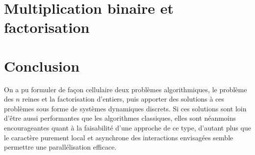 \documentclass[11pt, openany, a4paper]{article}
\newcommand{\ANNOT}[1]{
  ~\linebreak
  \centerline{
    \large\fcolorbox{black}{bleuclair}{
      \begin{minipage}[h]{.8\linewidth}
      #1
      \end{minipage}
    }
  }
}
\begin{document}
\part*{Multiplication binaire et factorisation}
\label{part:facto}





\part*{Conclusion}

On a pu formuler de façon cellulaire deux problèmes algorithmiques, le problème des $n$ reines et la factorisation d'entiers, puis apporter des solutions à ces problèmes sous forme de systèmes dynamiques discrets. Si ces solutions sont loin d'être aussi performantes que les algorithmes classiques, elles sont néanmoins encourageantes quant à la faisabilité d'une approche de ce type, d'autant plus que le caractère purement local et asynchrone des interactions envisagées semble permettre une parallélisation efficace. 





\end{document}
